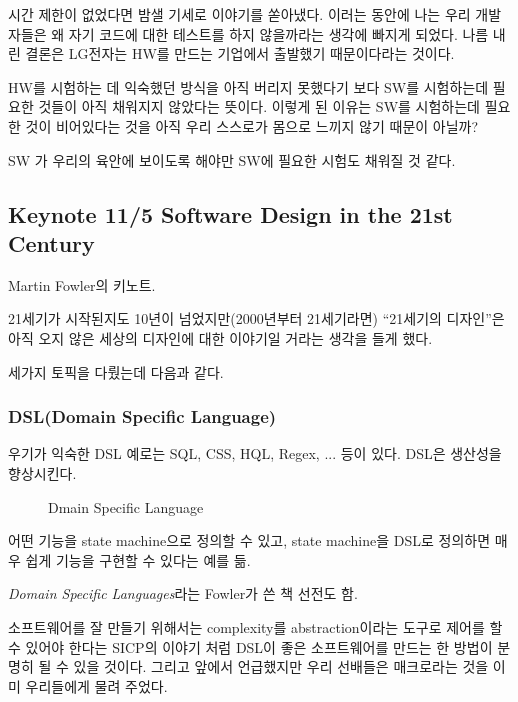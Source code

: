 \documentclass[a4paper]{article}
\begin{document}
시간 제한이 없었다면 밤샐 기세로 이야기를 쏟아냈다. 이러는 동안에 나는
우리 개발자들은 왜 자기 코드에 대한 테스트를 하지 않을까라는 생각에
빠지게 되었다. 나름 내린 결론은 LG전자는 HW를 만드는 기업에서 출발했기
때문이다라는 것이다.
 
HW를 시험하는 데 익숙했던 방식을 아직 버리지 못했다기 보다 SW를
시험하는데 필요한 것들이 아직 채워지지 않았다는 뜻이다. 이렇게 된
이유는 SW를 시험하는데 필요한 것이 비어있다는 것을 아직 우리 스스로가
몸으로 느끼지 않기 때문이 아닐까?
 
SW 가 우리의 육안에 보이도록 해야만 SW에 필요한 시험도 채워질 것 같다.
 
\subsection{Keynote 11/5 Software Design in the 21st Century}
 
Martin Fowler의 키노트.
 
21세기가 시작된지도 10년이 넘었지만(2000년부터 21세기라면) ``21세기의
디자인''은 아직 오지 않은 세상의 디자인에 대한 이야기일 거라는 생각을
들게 했다.
 
세가지 토픽을 다뤘는데 다음과 같다.
 
\subsubsection{DSL(Domain Specific Language)}
 
우기가 익숙한 DSL 예로는 SQL, CSS, HQL, Regex, ... 등이 있다. DSL은 생산성을 향상시킨다.

\begin{figure}[t]
    \begin{Frame}
        \begin{center}
        \end{center}
    \end{Frame}
    \caption{Dmain Specific Language}
    \label{dsl}
\end{figure}
 
어떤 기능을 state machine으로 정의할 수 있고, state machine을 DSL로
정의하면 매우 쉽게 기능을 구현할 수 있다는 예를 듦.
 
\textit{Domain Specific Languages}라는 Fowler가 쓴 책 선전도 함.
 
소프트웨어를 잘 만들기 위해서는 complexity를 abstraction이라는 도구로
제어를 할 수 있어야 한다는 SICP의 이야기 처럼 DSL이 좋은 소프트웨어를
만드는 한 방법이 분명히 될 수 있을 것이다. 그리고 앞에서 언급했지만
우리 선배들은 매크로라는 것을 이미 우리들에게 물려 주었다.
 
\end{document}

